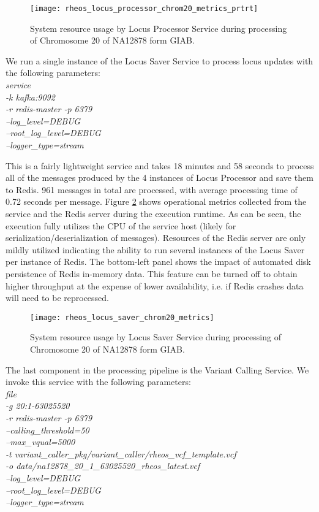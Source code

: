 \begin{figure}[h!]
    \texttt{[image: rheos\_locus\_processor\_chrom20\_metrics\_prtrt]}
    \centering
    \caption {System resource usage by Locus Processor Service during processing of Chromosome 20 of NA12878 form GIAB.}
    \label{fig:rheos_locus_processor_chrom20_metrics}
\end{figure}


We run a single instance of the Locus Saver Service to process locus updates with the following parameters:
\\
\emph{service\\
-k kafka:9092\\
-r redis-master -p 6379\\
--log\_level=DEBUG\\
--root\_log\_level=DEBUG\\
--logger\_type=stream}

This is a fairly lightweight service and takes 18 minutes and 58 seconds to process all of the messages produced by the  4 instances of Locus Processor and save them to Redis. 961 messages in total are processed, with average processing time of 0.72 seconds per message. Figure \ref{fig:rheos_locus_saver_chrom20_metrics} shows operational metrics collected from the service and the Redis server during the execution runtime. As can be seen, the execution fully utilizes the CPU of the service host (likely for serialization/deserialization of messages). Resources of the Redis server are only mildly utilized indicating the ability to run several instances of the Locus Saver per instance of Redis. The bottom-left panel shows the impact of automated disk persistence of Redis in-memory data. This feature can be turned off to obtain higher throughput at the expense of lower availability, i.e. if Redis crashes data will need to be reprocessed.   

\begin{figure}[h!]
    \texttt{[image: rheos\_locus\_saver\_chrom20\_metrics]}
    \centering
    \caption {System resource usage by Locus Saver Service during processing of Chromosome 20 of NA12878 form GIAB.}
    \label{fig:rheos_locus_saver_chrom20_metrics}
\end{figure}

The last component in the processing pipeline is the Variant Calling Service. We invoke this service with the following parameters:
\\
\emph{file\\
-g 20:1-63025520\\
-r redis-master -p 6379\\
--calling\_threshold=50\\
--max\_vqual=5000\\
-t variant\_caller\_pkg/variant\_caller/rheos\_vcf\_template.vcf\\
-o data/na12878\_20\_1\_63025520\_rheos\_latest.vcf\\
--log\_level=DEBUG\\
--root\_log\_level=DEBUG\\
--logger\_type=stream}

